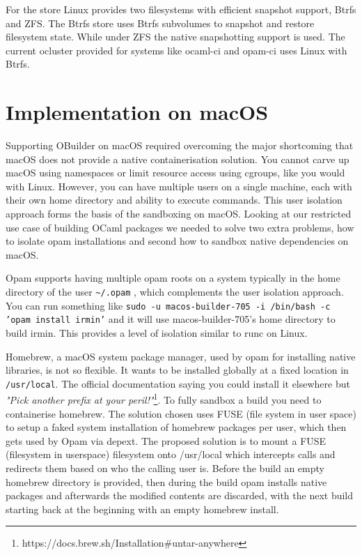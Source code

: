 \documentclass[manuscript,screen,sigplan]{acmart}
\begin{document}
For the store Linux provides two filesystems with efficient snapshot support, Btrfs and ZFS. The Btrfs store uses Btrfs subvolumes to snapshot and restore filesystem state. While under ZFS the native snapshotting support is used. The current ocluster provided for systems like ocaml-ci and opam-ci uses Linux with Btrfs.

\section{Implementation on macOS}
Supporting OBuilder on macOS required overcoming the major shortcoming that macOS does not provide a native containerisation solution. You cannot carve up macOS using namespaces or limit resource access using cgroups, like you would with Linux. However, you can have multiple users on a single machine, each with their own home directory and ability to execute commands. This user isolation approach forms the basis of the sandboxing on macOS. Looking at our restricted use case of building OCaml packages we needed to solve two extra problems, how to isolate opam installations and second how to sandbox native dependencies on macOS.

Opam supports having multiple opam roots on a system typically in the home directory of the user \texttt{\textasciitilde/.opam} , which complements the user isolation approach. You can run something like \texttt{sudo -u macos-builder-705 -i /bin/bash -c 'opam install irmin'} and it will use macos-builder-705’s home directory to build irmin. This provides a level of isolation similar to runc on Linux.

Homebrew, a macOS system package manager, used by opam for installing native libraries, is not so flexible. It wants to be installed globally at a fixed location in \texttt{/usr/local}. The official documentation saying you could install it elsewhere but \emph{"Pick another prefix at your peril!"}\footnote{https://docs.brew.sh/Installation\#untar-anywhere}. To fully sandbox a build you need to containerise homebrew. The solution chosen uses FUSE (file system in user space) to setup a faked system installation of homebrew packages per user, which then gets used by Opam via depext. The proposed solution is to mount a FUSE (filesystem in userspace) filesystem onto /usr/local which intercepts calls and redirects them based on who the calling user is. Before the build an empty homebrew directory is provided, then during the build opam installs native packages and afterwards the modified contents are discarded, with the next build starting back at the beginning with an empty homebrew install.
\end{document}
